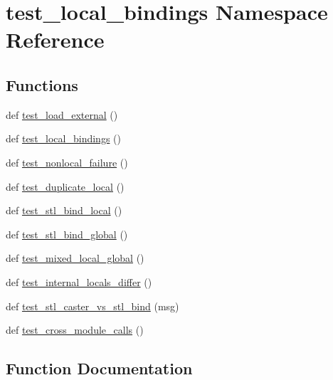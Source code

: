 \hypertarget{namespacetest__local__bindings}{}\section{test\+\_\+local\+\_\+bindings Namespace Reference}
\label{namespacetest__local__bindings}
\subsection*{Functions}
\begin{DoxyCompactItemize}
\item 
def \mbox{\hyperlink{namespacetest__local__bindings_a74879937e35258fb5bb64e0c54123958}{test\+\_\+load\+\_\+external}} ()
\item 
def \mbox{\hyperlink{namespacetest__local__bindings_a4049ee495a07c69bf03d37d6d77259d1}{test\+\_\+local\+\_\+bindings}} ()
\item 
def \mbox{\hyperlink{namespacetest__local__bindings_a0f2dc6fa85f74e8b754696aa20f68681}{test\+\_\+nonlocal\+\_\+failure}} ()
\item 
def \mbox{\hyperlink{namespacetest__local__bindings_a641060e93ec6852ee97d786e47fc78e9}{test\+\_\+duplicate\+\_\+local}} ()
\item 
def \mbox{\hyperlink{namespacetest__local__bindings_acad0e8cde4bdc9fd13a5d4c938e23e6f}{test\+\_\+stl\+\_\+bind\+\_\+local}} ()
\item 
def \mbox{\hyperlink{namespacetest__local__bindings_a93862ca3bfbed9b8ff63680dc7910593}{test\+\_\+stl\+\_\+bind\+\_\+global}} ()
\item 
def \mbox{\hyperlink{namespacetest__local__bindings_a23ac750737cd60717eac38fa84b0e2c2}{test\+\_\+mixed\+\_\+local\+\_\+global}} ()
\item 
def \mbox{\hyperlink{namespacetest__local__bindings_a07fe6fdd4ccaa3697563f193a9b0fcd1}{test\+\_\+internal\+\_\+locals\+\_\+differ}} ()
\item 
def \mbox{\hyperlink{namespacetest__local__bindings_ad5623f08ba98a36b99196b9461a0d1ca}{test\+\_\+stl\+\_\+caster\+\_\+vs\+\_\+stl\+\_\+bind}} (msg)
\item 
def \mbox{\hyperlink{namespacetest__local__bindings_a26bfc5189a484ce000784c5c3a095940}{test\+\_\+cross\+\_\+module\+\_\+calls}} ()
\end{DoxyCompactItemize}


\subsection{Function Documentation}
\mbox{\label{namespacetest__local__bindings_a26bfc5189a484ce000784c5c3a095940}} 
